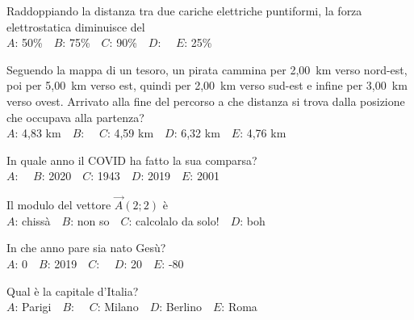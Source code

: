 \mcquestionfooter



\def\mcquestionnumber{8}


\mcquestionheader Raddoppiando la distanza tra due cariche elettriche puntiformi, la forza elettrostatica diminuisce del\\
{$A$}: 50\%\ \ {$B$}: 75\%\ \ {$C$}: 90\%\ \ {$D$}: \ \ {$E$}: 25\%\ \ 

\mcquestionfooter



\def\mcquestionnumber{9}


\mcquestionheader Seguendo la mappa di un tesoro, un pirata cammina per 2,00~km verso nord-est, poi per 5,00~km verso est, quindi per 2,00~km verso sud-est e infine per 3,00~km verso ovest. Arrivato alla fine del percorso a che distanza si trova dalla posizione che occupava alla partenza?\\
{$A$}: 4,83 km\ \ {$B$}: \ \ {$C$}: 4,59 km\ \ {$D$}: 6,32 km\ \ {$E$}: 4,76 km\ \ 

\mcquestionfooter



\def\mcquestionnumber{10}


\mcquestionheader In quale anno il COVID ha fatto la sua comparsa?\\
{$A$}: \ \ {$B$}: 2020\ \ {$C$}: 1943\ \ {$D$}: 2019\ \ {$E$}: 2001\ \ 

\mcquestionfooter



\def\mcquestionnumber{11}


\mcquestionheader Il modulo del vettore $\vec{A}(2;2)$ è\\
{$A$}: chissà\ \ {$B$}: non so\ \ {$C$}: calcolalo da solo!\ \ {$D$}: boh\ \ 

\mcquestionfooter



\def\mcquestionnumber{12}


\mcquestionheader In che anno pare sia nato Gesù?\\
{$A$}: 0\ \ {$B$}: 2019\ \ {$C$}: \ \ {$D$}: 20\ \ {$E$}: -80\ \ 

\mcquestionfooter



\mcpaperfooter

\def\mcserialnumber{12}
\mcpaperheader


\def\mcquestionnumber{1}


\mcquestionheader Qual è la capitale d’Italia?\\
{$A$}: Parigi\ \ {$B$}: \ \ {$C$}: Milano\ \ {$D$}: Berlino\ \ {$E$}: Roma\ \ 

